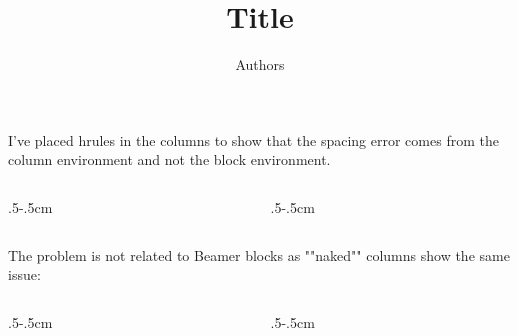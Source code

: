\documentclass[]{beamer}
\title[]{Title}
\author[]{Authors}
\date{}
\institute[]{Institute}
\begin{document}
\setlength\columnsep{0pt}

\begin{frame}{}

\begin{block}{}
I've placed hrules in the columns to show that the spacing error comes from the column environment and not the block environment.\\
\hrulefill
\begin{columns}[T,onlytextwidth]
\begin{column}{.5\textwidth-.5cm}\hrulefill\begin{block}{}\vspace{5em}\end{block}\end{column}
\begin{column}{.5\textwidth-.5cm}\hrulefill\begin{block}{}\end{block}\end{column}
\end{columns}
\end{block}

The problem is not related to Beamer blocks as ""naked"" columns show the same issue:\\
\hrulefill
\begin{columns}[T,onlytextwidth]
\begin{column}{.5\textwidth-.5cm}\hrulefill\begin{block}{}\end{block}\end{column}
\begin{column}{.5\textwidth-.5cm}\hrulefill\begin{block}{}\end{block}\end{column}
\end{columns}


\end{frame}
\end{document}
